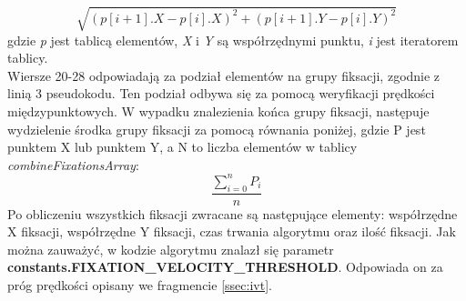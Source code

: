 \[\sqrt{(p[i+1].X - p[i].X)^2 + (p[i+1].Y - p[i].Y)^2}\]
gdzie \emph{p} jest tablicą elementów, \emph{X} i \emph{Y} są współrzędnymi punktu, \emph{i} jest iteratorem tablicy.\\
Wiersze 20-28 odpowiadają za podział elementów na grupy fiksacji, zgodnie z linią 3 pseudokodu. Ten podział odbywa się za pomocą weryfikacji prędkości międzypunktowych. W wypadku znalezienia końca grupy fiksacji, następuje wydzielenie środka grupy fiksacji za pomocą równania poniżej, gdzie P jest punktem X lub punktem Y, a N to liczba elementów w tablicy \emph{combineFixationsArray}: 
\[
        \frac{\sum_{i = 0}^{n}{P_i}}{n}
\]
Po obliczeniu wszystkich fiksacji zwracane są następujące elementy: współrzędne X fiksacji, współrzędne Y fiksacji, czas trwania algorytmu oraz ilość fiksacji. Jak można zauważyć, w kodzie algorytmu znalazł się parametr \textbf{constants.FIXATION\_VELOCITY\_THRESHOLD}. Odpowiada on za próg prędkości opisany we fragmencie \ref{ssec:ivt}.

